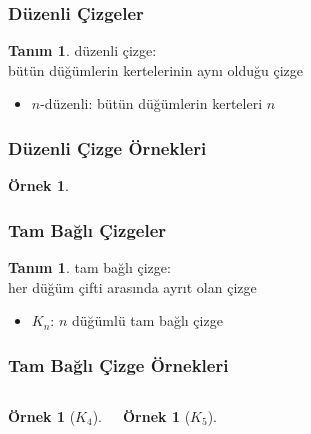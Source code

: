 \documentclass[dvipsnames]{beamer}
\theoremstyle{definition}
\newtheorem{tanim}[theorem]{Tanım}
\theoremstyle{example}
\newtheorem{ornek}[theorem]{Örnek}
\theoremstyle{plain}
\begin{document}
\begin{frame}
  \frametitle{Düzenli Çizgeler}

  \begin{tanim}
    \alert{düzenli çizge}:\\
    bütün düğümlerin kertelerinin aynı olduğu çizge

    \begin{itemize}
      \item $n$-düzenli: bütün düğümlerin kerteleri $n$
    \end{itemize}
  \end{tanim}
\end{frame}

\begin{frame}
  \frametitle{Düzenli Çizge Örnekleri}

  \begin{ornek}
    \begin{center}
    \end{center}
  \end{ornek}
\end{frame}

\begin{frame}
  \frametitle{Tam Bağlı Çizgeler}

  \begin{tanim}
    \alert{tam bağlı çizge}:\\
    her düğüm çifti arasında ayrıt olan çizge

    \begin{itemize}
      \item $K_n$: $n$ düğümlü tam bağlı çizge
    \end{itemize}
  \end{tanim}
\end{frame}

\begin{frame}
  \frametitle{Tam Bağlı Çizge Örnekleri}

  \begin{columns}
    \begin{ornek}[$K_4$]
      \begin{center}
      \end{center}
    \end{ornek}

    \begin{ornek}[$K_5$]
      \begin{center}
      \end{center}
    \end{ornek}
  \end{columns}
\end{frame}
\end{document}
